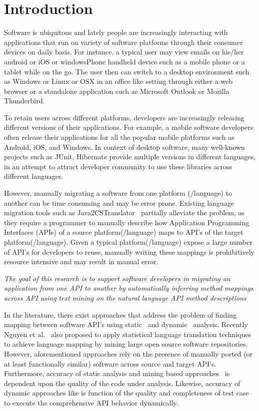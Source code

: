 \section{Introduction}
\label{sec:introduction}


Software is ubiquitous and lately people are increasingly interacting with applications
that run on variety of software platforms through their consumer devices on daily basis.
For instance, a typical user may view emails on his/her android or iOS or windowsPhone handheld
device such as a mobile phone or a tablet while on the go. 
The user then can switch to a desktop environment such as Windows or Linux or OSX 
in an office like setting through either a web browser or 
a standalone application such as Microsoft Outlook or Mozilla Thunderbird.


To retain users across different platforms,
developers are increasingly releasing different versions of their applications.
For example, a mobile software developers often release their applications
for all the popular mobile platforms such as Android, iOS, and Windows.
In context of desktop software, many well-known projects such as JUnit,
Hibernate provide multiple versions in different languages,
in an attempt to attract developer community to use these
libraries across different languages.


However, manually migrating a software from one platform (/language) to another
can be time consuming and may be error prone.
Existing language migration tools such as Java2CSTranslator~\cite{java2cstranslator}
partially alleviate the problem, as they require a programmer to manually describe how Application Programming Interfaces (APIs) of a source platform(/language) maps to API's of the target platform(/language). 
Given a typical platform(/language) expose a large number of API's for developers to reuse, manually writing these mappings is prohibitively resource intensive and may result in manual error.


\textit{The goal of this research is to support software developers 
in migrating an application from one API to another
by automatically inferring method mappings across API using text mining
on the natural language API method descriptions}


In the literature, there exist approaches that address the problem of finding mapping between  software API's using static~\cite{Zhong2010ICSE} and dynamic~\cite{Gokhale2013ICSE} analysis. 
Recently Nguyen et al.~\cite{nguyen2014statistical} also proposed to apply statistical language translation techniques to achieve language mapping by mining large open source software repositories.  
However, aforementioned approaches rely on the presence of manually ported (or at least functionally similar) software across source and target API's.
Furthermore, accuracy of static analysis and mining based approaches~\cite{Zhong2010ICSE,nguyen2014statistical} is dependent upon the quality of the code under analysis.
Likewise, accuracy of dynamic approaches like \cite{Gokhale2013ICSE} is function of the quality and completeness of test case to execute the comprehensive API behavior dynamically. 


